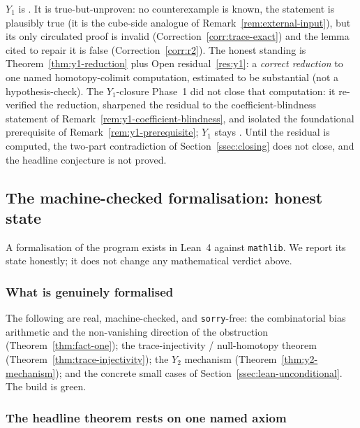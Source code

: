 \begin{status}
$Y_1$ is . It is true-but-unproven: no counterexample is
known, the statement is plausibly true (it is the cube-side analogue of
Remark~\ref{rem:external-input}), but its only circulated proof is
invalid (Correction~\ref{corr:trace-exact}) and the lemma cited to
repair it is false (Correction~\ref{corr:r2}). The honest standing is
Theorem~\ref{thm:y1-reduction} plus Open residual~\ref{res:y1}: a
\emph{correct reduction} to one named homotopy-colimit computation,
estimated to be substantial (not a hypothesis-check). The $Y_1$-closure
Phase~1 did not close that computation: it re-verified the reduction,
sharpened the residual to the coefficient-blindness statement of
Remark~\ref{rem:y1-coefficient-blindness}, and isolated the foundational
prerequisite of Remark~\ref{rem:y1-prerequisite}; $Y_1$ stays
. Until the residual is computed, the two-part contradiction of
Section~\ref{ssec:closing} does not close, and the headline conjecture
is not proved.
\end{status}

\subsection{The machine-checked formalisation: honest state}
\label{ssec:lean-state}

A formalisation of the program exists in Lean~4 against
\texttt{mathlib}. We report its state honestly; it does not change any
mathematical verdict above.

\subsubsection{What is genuinely formalised}
\label{ssec:lean-genuine}

The following are real, machine-checked, and \texttt{sorry}-free:
the combinatorial bias arithmetic and the non-vanishing direction of
the obstruction (Theorem~\ref{thm:fact-one}); the
trace-injectivity / null-homotopy theorem
(Theorem~\ref{thm:trace-injectivity}); the $Y_2$ mechanism
(Theorem~\ref{thm:y2-mechanism}); and the concrete small cases of
Section~\ref{ssec:lean-unconditional}. The build is green.

\subsubsection{The headline theorem rests on one named axiom}
\label{ssec:axiom-is-frankl}

